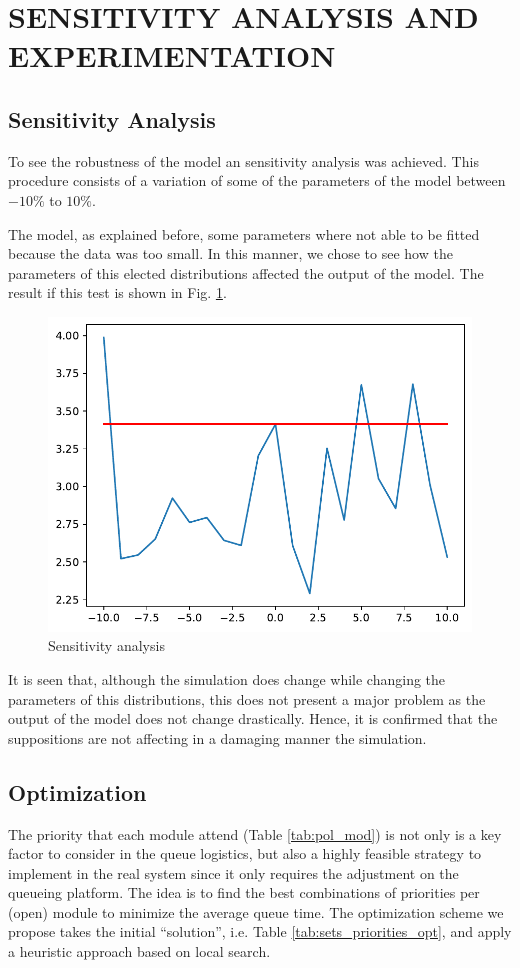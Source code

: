 \section{SENSITIVITY ANALYSIS AND EXPERIMENTATION}

\subsection{Sensitivity Analysis}

To see the robustness of the model an sensitivity analysis was achieved. This procedure consists of a variation of some of the parameters of the model between $-10\%$ to $10\%$. 

The model, as explained before, some parameters where not able to be fitted because the data was too small. In this manner, we chose to see how the parameters of this elected distributions affected the output of the model. The result if this test is shown in Fig. \ref{fig:sens-anal}. 

\begin{figure}[H]
    \centering
    \includegraphics[scale=0.6]{files/sens-anal.pdf}
    \caption{Sensitivity analysis}
    \label{fig:sens-anal}
\end{figure}

It is seen that, although the simulation does change while changing the parameters of this distributions, this does not present a major problem as the output of the model does not change drastically. Hence, it is confirmed that the suppositions are not affecting in a damaging manner the simulation.

\subsection{Optimization}
The priority that each module attend (Table \ref{tab:pol_mod}) is not only is a key factor to consider in the queue logistics, but also a highly feasible strategy to implement in the real system since it only requires the adjustment on the queueing platform. The idea is to find the best combinations of priorities per (open) module to minimize the average queue time. The optimization scheme we propose takes the initial ``solution'', i.e. Table \ref{tab:sets_priorities_opt}, and apply a heuristic approach based on local search.

